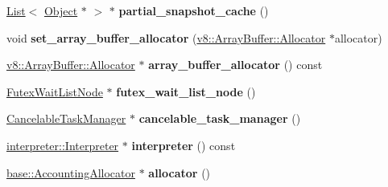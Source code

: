 \begin{DoxyCompactItemize}
\item 
\hyperlink{classv8_1_1internal_1_1_list}{List}$<$ \hyperlink{classv8_1_1internal_1_1_object}{Object} $\ast$ $>$ $\ast$ {\bfseries partial\+\_\+snapshot\+\_\+cache} ()\hypertarget{classv8_1_1internal_1_1_isolate_ac4afc7b935c9929860023037cf489242}{}\label{classv8_1_1internal_1_1_isolate_ac4afc7b935c9929860023037cf489242}

\item 
void {\bfseries set\+\_\+array\+\_\+buffer\+\_\+allocator} (\hyperlink{classv8_1_1_array_buffer_1_1_allocator}{v8\+::\+Array\+Buffer\+::\+Allocator} $\ast$allocator)\hypertarget{classv8_1_1internal_1_1_isolate_aea4c8c96eaaf8d0bf8e3f08ceaf07f34}{}\label{classv8_1_1internal_1_1_isolate_aea4c8c96eaaf8d0bf8e3f08ceaf07f34}

\item 
\hyperlink{classv8_1_1_array_buffer_1_1_allocator}{v8\+::\+Array\+Buffer\+::\+Allocator} $\ast$ {\bfseries array\+\_\+buffer\+\_\+allocator} () const \hypertarget{classv8_1_1internal_1_1_isolate_a8441bc3d34f17f69530d75ba32a02fac}{}\label{classv8_1_1internal_1_1_isolate_a8441bc3d34f17f69530d75ba32a02fac}

\item 
\hyperlink{classv8_1_1internal_1_1_futex_wait_list_node}{Futex\+Wait\+List\+Node} $\ast$ {\bfseries futex\+\_\+wait\+\_\+list\+\_\+node} ()\hypertarget{classv8_1_1internal_1_1_isolate_a1b279223b072f901349bc70d0decfcf0}{}\label{classv8_1_1internal_1_1_isolate_a1b279223b072f901349bc70d0decfcf0}

\item 
\hyperlink{classv8_1_1internal_1_1_cancelable_task_manager}{Cancelable\+Task\+Manager} $\ast$ {\bfseries cancelable\+\_\+task\+\_\+manager} ()\hypertarget{classv8_1_1internal_1_1_isolate_a6ca088205654decf7abab43340be424a}{}\label{classv8_1_1internal_1_1_isolate_a6ca088205654decf7abab43340be424a}

\item 
\hyperlink{classv8_1_1internal_1_1interpreter_1_1_interpreter}{interpreter\+::\+Interpreter} $\ast$ {\bfseries interpreter} () const \hypertarget{classv8_1_1internal_1_1_isolate_a3a29e18a1fe466bc746c412427d138a5}{}\label{classv8_1_1internal_1_1_isolate_a3a29e18a1fe466bc746c412427d138a5}

\item 
\hyperlink{classv8_1_1base_1_1_accounting_allocator}{base\+::\+Accounting\+Allocator} $\ast$ {\bfseries allocator} ()\hypertarget{classv8_1_1internal_1_1_isolate_afbd9b92dec64a4b2296811914b1881ff}{}\label{classv8_1_1internal_1_1_isolate_afbd9b92dec64a4b2296811914b1881ff}

\end{DoxyCompactItemize}
